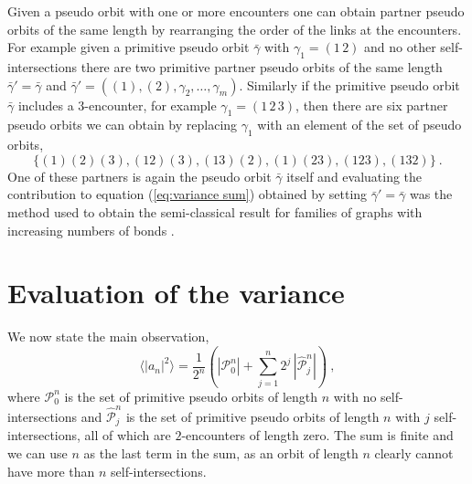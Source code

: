 \documentclass[doublecol]{epl2}
\newcommand{\bg}{\bar{\gamma}}
\begin{document}
Given a pseudo orbit with one or more encounters one can obtain partner pseudo orbits of the same length by rearranging the order of the links at the encounters.  For example given a primitive pseudo orbit $\bg$ with $\gamma_1 = (1 \, 2)$ and no other self-intersections there are two primitive partner pseudo orbits of the same length $\bg'=\bg$ and $\bg'= ((1),(2),\gamma_2,\dots, \gamma_m)$.  Similarly if the primitive pseudo orbit $\bg$ includes a $3$-encounter, for example $\gamma_1=(1\,2\,3)$, then there are six partner pseudo orbits we can obtain by replacing $\gamma_1$ with an element of the set of pseudo orbits,
\begin{equation*}
\{ (1)(2)(3), (12)(3), (13)(2), (1)(23), (123), (132) \} \ .
\end{equation*} 
One of these partners is again the pseudo orbit $\bg$ itself and evaluating the contribution to equation (\ref{eq:variance sum}) obtained by setting $\bg'=\bg$ was the method used to obtain the semi-classical result for families of graphs with increasing numbers of bonds \cite{BHJ12,T02}.

\section{Evaluation of the variance}

We now state the main observation,
\begin{equation}
\label{eq:variancefinal}
\langle |a_n|^2 \rangle
= \frac{1}{2^{n}} \left( |\mathcal{P}_0^n| + \sum_{j=1}^n 2^j \, |\widehat{\mathcal{P}}_{j}^n| \right) \ ,
\end{equation}
where $\mathcal{P}_0^n$ is the set of primitive pseudo orbits of length $n$ with no self-intersections and $\widehat{\mathcal{P}}_{j}^n$ is the set of primitive pseudo orbits of length $n$ with $j$ self-intersections, all of which are $2$-encounters of length zero.  The sum is finite and we can use $n$ as the last term in the sum, as an orbit of length $n$ clearly cannot have more than $n$ self-intersections.
\end{document}

